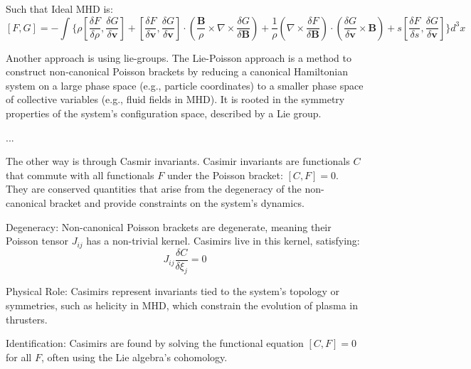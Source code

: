 \par Such that Ideal MHD is:
$$[F, G] = -\int \Bigg\{
\rho \left[ \frac{\delta F}{\delta \rho}, \frac{\delta G}{\delta \mathbf{v}} \right]
+ \left[ \frac{\delta F}{\delta \mathbf{v}}, \frac{\delta G}{\delta \mathbf{v}} \right] \cdot \left( \frac{\mathbf{B}}{\rho} \times \nabla \times \frac{\delta G}{\delta \mathbf{B}} \right)
+ \frac{1}{\rho} \left( \nabla \times \frac{\delta F}{\delta \mathbf{B}} \right) \cdot \left( \frac{\delta G}{\delta \mathbf{v}} \times \mathbf{B} \right)
+ s \left[ \frac{\delta F}{\delta s}, \frac{\delta G}{\delta \mathbf{v}} \right]
\Bigg\} d^3x$$
\par Another approach is using lie-groups. The Lie-Poisson approach is a method to construct non-canonical Poisson brackets by reducing a canonical Hamiltonian system on a large phase space (e.g., particle coordinates) to a smaller phase space of collective variables (e.g., fluid fields in MHD). It is rooted in the symmetry properties of the system’s configuration space, described by a Lie group.
\par ...
\par The other way is through Casmir invariants. Casimir invariants are functionals $C$ that commute with all functionals $F$ under the Poisson bracket: $[C, F] = 0$. They are conserved quantities that arise from the degeneracy of the non-canonical bracket and provide constraints on the system’s dynamics.
\par Degeneracy: Non-canonical Poisson brackets are degenerate, meaning their Poisson tensor $J_{ij}$ has a non-trivial kernel. Casimirs live in this kernel, satisfying:
$$J_{ij} \frac{\delta C}{\delta \xi_j} = 0$$

\par Physical Role: Casimirs represent invariants tied to the system’s topology or symmetries, such as helicity in MHD, which constrain the evolution of plasma in thrusters.
\par Identification: Casimirs are found by solving the functional equation $[C, F] = 0$ for all $F$, often using the Lie algebra’s cohomology.
